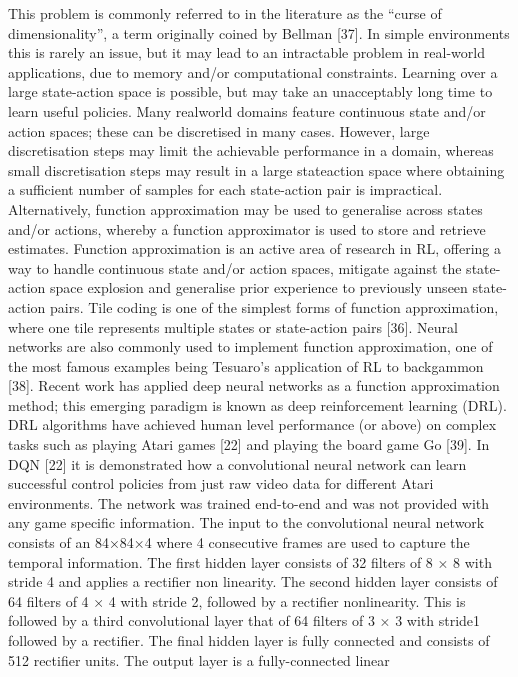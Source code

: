 This problem is commonly referred to in the literature as the
“curse of dimensionality”, a term originally coined by Bellman
[37]. In simple environments this is rarely an issue, but it
may lead to an intractable problem in real-world applications,
due to memory and/or computational constraints. Learning
over a large state-action space is possible, but may take an
unacceptably long time to learn useful policies. Many realworld domains feature continuous state and/or action spaces;
these can be discretised in many cases. However, large discretisation steps may limit the achievable performance in a domain,
whereas small discretisation steps may result in a large stateaction space where obtaining a sufficient number of samples
for each state-action pair is impractical. Alternatively, function
approximation may be used to generalise across states and/or
actions, whereby a function approximator is used to store and
retrieve estimates. Function approximation is an active area
of research in RL, offering a way to handle continuous state
and/or action spaces, mitigate against the state-action space
explosion and generalise prior experience to previously unseen
state-action pairs. Tile coding is one of the simplest forms
of function approximation, where one tile represents multiple
states or state-action pairs [36]. Neural networks are also
commonly used to implement function approximation, one of
the most famous examples being Tesuaro’s application of RL
to backgammon [38]. Recent work has applied deep neural
networks as a function approximation method; this emerging
paradigm is known as deep reinforcement learning (DRL).
DRL algorithms have achieved human level performance (or
above) on complex tasks such as playing Atari games [22] and
playing the board game Go [39].
In DQN [22] it is demonstrated how a convolutional neural
network can learn successful control policies from just raw
video data for different Atari environments. The network
was trained end-to-end and was not provided with any game
specific information. The input to the convolutional neural
network consists of an 84×84×4 where 4 consecutive frames
are used to capture the temporal information. The first hidden
layer consists of 32 filters of 8 × 8 with stride 4 and applies
a rectifier non linearity. The second hidden layer consists of
64 filters of 4 × 4 with stride 2, followed by a rectifier nonlinearity. This is followed by a third convolutional layer that
of 64 filters of 3 × 3 with stride1 followed by a rectifier.
The final hidden layer is fully connected and consists of 512
rectifier units. The output layer is a fully-connected linear
